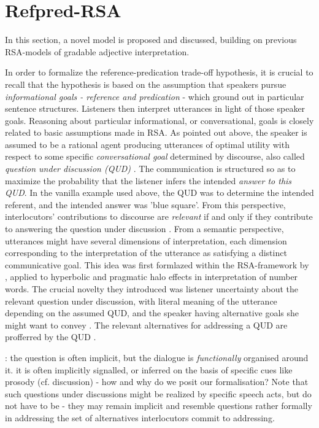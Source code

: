 \section{Refpred-RSA}
In this section, a novel model is proposed and discussed, building on previous RSA-models of gradable adjective interpretation.

In order to formalize the reference-predication trade-off hypothesis, it is crucial to recall that the hypothesis is based on the assumption that speakers pursue \emph{informational goals - reference and predication} - which ground out in particular sentence structures. Listeners then interpret utterances in light of those speaker goals. Reasoning about particular informational, or conversational, goals is closely related to basic assumptions made in RSA.
As pointed out above, the speaker is assumed to be a rational agent producing utterances of optimal utility with respect to some specific \emph{conversational goal} determined by discourse, also called \emph{question under discussion (QUD)}  \parencite{lassiter2017adjectival, roberts2012information}. The communication is structured so as to maximize the probability that the listener infers the intended \emph{answer to this QUD}. In the vanilla example used above, the QUD was to determine the intended referent, and the intended answer was 'blue square'. From this perspective, interlocutors' contributions to discourse are \emph{relevant} if and only if they contribute to answering the question under discussion \parencite{roberts2012information}. From a semantic perspective, utterances might have several dimensions of interpretation, each dimension corresponding to the interpretation of the utterance as satisfying a distinct communicative goal. This idea was first formlazed within the RSA-framework by \textcite{kao2014nonliteral}, applied to hyperbolic and pragmatic halo effects in interpretation of number words. The crucial novelty they introduced was listener uncertainty about the relevant question under discussion, with literal meaning of the utterance depending on the assumed QUD, and the speaker having alternative goals she might want to convey \parencite{kao2014nonliteral}.
The relevant alternatives for addressing a QUD are profferred by the QUD \parencite{roberts2012information}. 

\textcite{roberts2012information}: the question is often implicit, but the dialogue is \emph{functionally} organised around it. it is often implicitly signalled, or inferred on the basis of specific cues like prosody (cf. discussion) - how and why do we posit our formalisation?
Note that such questions under discussions might be realized by specific speech acts, but do not have to be - they may remain implicit and resemble questions rather formally in addressing the set of alternatives interlocutors commit to addressing.  